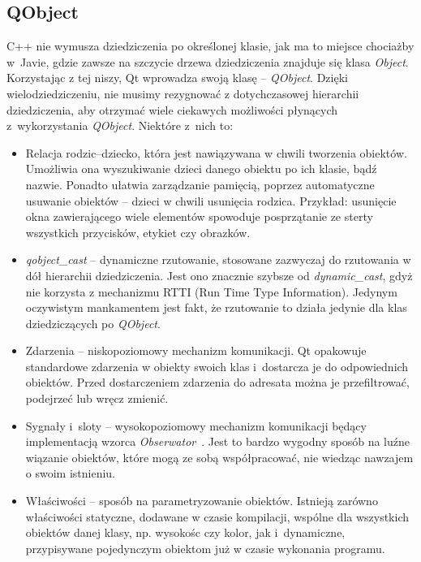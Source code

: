 \subsection{QObject}
C++ nie wymusza dziedziczenia po określonej klasie, jak ma to miejsce chociażby w~Javie, gdzie zawsze na szczycie drzewa dziedziczenia znajduje się klasa \textit{Object}. Korzystając z tej niszy, Qt wprowadza swoją klasę -- \textit{QObject}. Dzięki wielodziedziczeniu, nie musimy rezygnować z dotychczasowej hierarchii dziedziczenia, aby otrzymać wiele ciekawych możliwości płynących z~wykorzystania \textit{QObject}.
Niektóre z~nich to:
\begin{itemize}
\item Relacja rodzic--dziecko, która jest nawiązywana w chwili tworzenia obiektów. Umożliwia ona wyszukiwanie dzieci danego obiektu po ich klasie, bądź nazwie. Ponadto ułatwia zarządzanie pamięcią, poprzez automatyczne usuwanie obiektów -- dzieci w chwili usunięcia rodzica. Przykład: usunięcie okna zawierającego wiele elementów spowoduje posprzątanie ze sterty wszystkich przycisków, etykiet czy obrazków.
\item \textit{qobject\_cast} -- dynamiczne rzutowanie, stosowane zazwyczaj do rzutowania w dół hierarchii dziedziczenia. Jest ono znacznie szybsze od \textit{dynamic\_cast}, gdyż nie korzysta z mechanizmu RTTI (Run Time Type Information). Jedynym oczywistym mankamentem jest fakt, że rzutowanie to działa jedynie dla klas dziedziczących po \textit{QObject}.
\item Zdarzenia -- niskopoziomowy mechanizm komunikacji. Qt opakowuje standardowe zdarzenia w obiekty swoich klas i~dostarcza je do odpowiednich obiektów. Przed dostarczeniem zdarzenia do adresata można je przefiltrować, podejrzeć lub wręcz zmienić.
\item Sygnały i~sloty -- wysokopoziomowy mechanizm komunikacji będący implementacją wzorca \textit{Obserwator}~\cite[269-279]{Patterns}.
Jest to bardzo wygodny sposób na luźne wiązanie obiektów, które mogą ze sobą współpracować, nie wiedząc nawzajem o swoim istnieniu.
\item Właściwości -- sposób na parametryzowanie obiektów. Istnieją zarówno właściwości statyczne, dodawane w czasie kompilacji, wspólne dla wszystkich obiektów danej klasy, np. wysokośc czy kolor, jak i~dynamiczne, przypisywane pojedynczym obiektom już w czasie wykonania programu.
\end{itemize}

